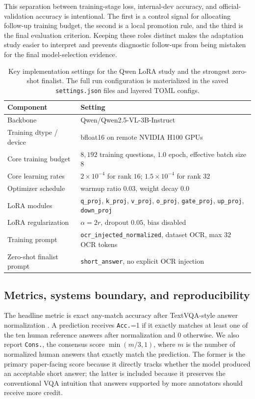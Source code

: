 This separation between training-stage loss, internal-dev accuracy, and official-validation accuracy is intentional. The first is a control signal for allocating follow-up training budget, the second is a local promotion rule, and the third is the final evaluation criterion. Keeping these roles distinct makes the adaptation study easier to interpret and prevents diagnostic follow-ups from being mistaken for the final model-selection evidence.

\begin{table}[t]
    \centering
    \small
    \begin{tabular}{ll}
        \toprule
        Component & Setting \\
        \midrule
        Backbone & Qwen/Qwen2.5-VL-3B-Instruct \\
        Training dtype / device & bfloat16 on remote NVIDIA H100 GPUs \\
        Core training budget & $8{,}192$ training questions, $1.0$ epoch, effective batch size $8$ \\
        Core learning rates & $2\times 10^{-4}$ for rank $16$; $1.5\times 10^{-4}$ for rank $32$ \\
        Optimizer schedule & warmup ratio $0.03$, weight decay $0.0$ \\
        LoRA modules & \texttt{q\_proj}, \texttt{k\_proj}, \texttt{v\_proj}, \texttt{o\_proj}, \texttt{gate\_proj}, \texttt{up\_proj}, \texttt{down\_proj} \\
        LoRA regularization & $\alpha=2r$, dropout $0.05$, bias disabled \\
        Training prompt & \texttt{ocr\_injected\_normalized}, dataset OCR, max $32$ OCR tokens \\
        Zero-shot finalist prompt & \texttt{short\_answer}, no explicit OCR injection \\
        \bottomrule
    \end{tabular}
    \caption{Key implementation settings for the Qwen LoRA study and the strongest zero-shot finalist. The full run configuration is materialized in the saved \texttt{settings.json} files and layered TOML configs.}
    \label{tab:hyperparams}
\end{table}

\subsection{Metrics, systems boundary, and reproducibility}

The headline metric is exact any-match accuracy after TextVQA-style answer normalization \citep{singh2019textvqa}. A prediction receives \texttt{Acc.}=1 if it exactly matches at least one of the ten human reference answers after normalization and 0 otherwise. We also report \texttt{Cons.}, the consensus score $\min(m/3,1)$, where $m$ is the number of normalized human answers that exactly match the prediction. The former is the primary paper-facing score because it directly tracks whether the model produced an acceptable short answer; the latter is included because it preserves the conventional VQA intuition that answers supported by more annotators should receive more credit.

